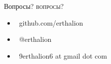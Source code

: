 \documentclass[usenames,dvipsnames, 18pt, compress, aspectratio=169]{beamer}
\def\twitter{{\FA \faTwitter}}
\def\github{{\FA \faGithubSign}}
\def\email{{\FA \faEnvelope}}
\begin{document}
\fontsize{17pt}{18}\selectfont
\begin{frame}
  \vspace*{2.5cm}
  \begin{minipage}[b][\paperheight]{\textwidth}
  \begin{center}

      \linespread{1.0}%
      \if@noSmallCapitals%
        Вопросы?
      \else%
        \scshape\MakeLowercase{Вопросы?}%
      \fi%
      \vspace*{0.3em}

      \fontsize{13pt}{14}\selectfont
        \begin{itemize}[label={}]
            \item {\github\ github.com/erthalion}
            \item {\twitter\ @erthalion}
            \item \email\ 9erthalion6 at gmail dot com
        \end{itemize}
      \vspace*{2.5em}%

    \vfill
    \vspace*{2em}
  \end{center}
  \end{minipage}

\end{frame}
\end{document}
